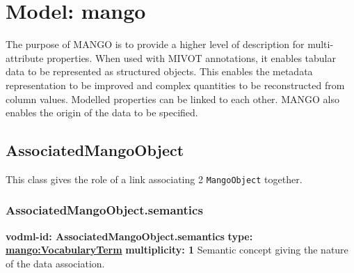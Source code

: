 
%



    
    
    
    
    
    
      

\pagebreak
\section{Model: mango }
  

  The purpose of MANGO is to provide a higher level of description for multi-attribute properties. When used with MIVOT annotations, it enables tabular data to be represented as structured objects. This enables the metadata representation to be improved and complex quantities to be reconstructed from column values. Modelled properties can be linked to each other. MANGO also enables the origin of the data to be specified.

  \subsection{AssociatedMangoObject}
  \label{sect:AssociatedMangoObject}
    This class gives the role of a link associating 2 \texttt{MangoObject} together.

    \subsubsection{AssociatedMangoObject.semantics}
      \textbf{vodml-id: AssociatedMangoObject.semantics} \newline
      \textbf{type: \hyperref[sect:VocabularyTerm]{mango:VocabularyTerm}} \newline
      \textbf{multiplicity: 1} \newline
      Semantic concept giving the nature of the data association.

